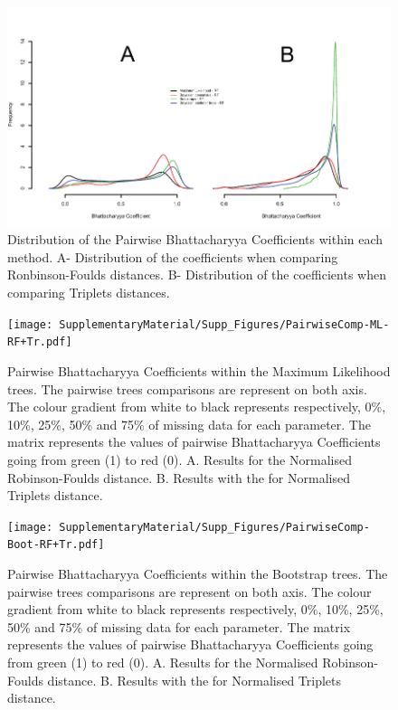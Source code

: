 \begin{figure} 
\centering
    \includegraphics[width=1\textwidth]{SupplementaryMaterial/Supp_Figures/BC-AllMethods-RF+Tr.pdf}
\caption{Distribution of the Pairwise Bhattacharyya Coefficients within each method. A- Distribution of the coefficients when comparing Ronbinson-Foulds distances. B- Distribution of the coefficients when comparing Triplets distances.}
\label{Fig_Bhatt.coeff_distribution} %
\end{figure}

\begin{figure} 
\centering
    \texttt{[image: SupplementaryMaterial/Supp\_Figures/PairwiseComp-ML-RF+Tr.pdf]}
\caption{Pairwise Bhattacharyya Coefficients within the Maximum Likelihood trees. The pairwise trees comparisons are represent on both axis. The colour gradient from white to black represents respectively, 0\%, 10\%, 25\%, 50\% and 75\% of missing data for each parameter. The matrix represents the values of pairwise Bhattacharyya Coefficients going from green (1) to red (0). A. Results for the Normalised Robinson-Foulds distance. B. Results with the for Normalised Triplets distance.}
\label{Fig_pairComp-Baytree-RF}
\end{figure} %

\begin{figure} 
\centering
    \texttt{[image: SupplementaryMaterial/Supp\_Figures/PairwiseComp-Boot-RF+Tr.pdf]}
\caption{Pairwise Bhattacharyya Coefficients within the Bootstrap trees. The pairwise trees comparisons are represent on both axis. The colour gradient from white to black represents respectively, 0\%, 10\%, 25\%, 50\% and 75\% of missing data for each parameter. The matrix represents the values of pairwise Bhattacharyya Coefficients going from green (1) to red (0). A. Results for the Normalised Robinson-Foulds distance. B. Results with the for Normalised Triplets distance.}
\label{Fig_pairComp-Baytree-Tr}
\end{figure} %

